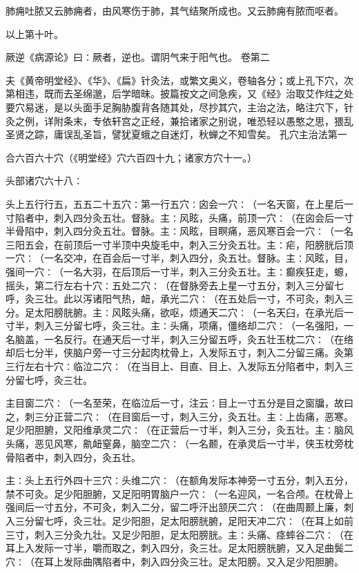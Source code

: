 \documentclass[a4paper,12pt,UTF8,twoside]{ctexbook}
\begin{document}
肺痈吐脓又云肺痈者，由风寒伤于肺，其气结聚所成也。又云肺痈有脓而呕者。

以上第十叶。

厥逆《病源论》曰∶厥者，逆也。谓阴气来于阳气也。
卷第二

夫《黄帝明堂经》、《华》、《扁》针灸法，或繁文奥义，卷轴各分；或上孔下穴，次第相违，既而去圣绵邈，后学暗昧。披篇按文之间急疾，又《经》治取艾作炷之处要穴易迷，是以头面手足胸胁腹背各随其处，尽抄其穴，主治之法，略注穴下，针灸之例，详附条末，专依轩宫之正经，兼拾诸家之别说，唯恐轻以愚憨之思，猥乱圣贤之踪，庸误乱圣旨，譬犹夏蛾之自迷灯，秋蝉之不知雪矣。
孔穴主治法第一

合六百六十穴（《明堂经》穴六百四十九；诸家方穴十一。）

头部诸穴六十八∶

头上五行行五，五五二十五穴∶第一行五穴∶囟会一穴∶（一名天窗，在上星后一寸陷者中，刺入四分灸五壮。督脉。主∶风眩，头痛，前顶一穴∶（在囟会后一寸半骨陷中，刺入四分灸五壮。督脉。主∶风眩，目瞑痛，恶风寒百会一穴∶（一名三阳五会，在前顶后一寸半顶中央旋毛中，刺入三分灸五壮。主∶疟，阳膀胱后顶一穴∶（一名交冲，在百会后一寸半，刺入四分，灸五壮。督脉。主∶风眩，目，强间一穴∶（一名大羽，在后顶后一寸半，刺入三分灸五壮。主∶癫疾狂走，螈，摇头，第二行左右十穴∶五处二穴∶（在督脉旁去上星一寸五分，刺入三分留七呼，灸三壮。此以泻诸阳气热，衄，承光二穴∶（在五处后一寸，不可灸，刺入三分。足太阳膀胱腑。主∶风眩头痛，欲呕，烦通天二穴∶（一名天臼，在承光后一寸半，刺入三分留七呼，灸三壮。主∶头痛，项痛，僵络却二穴∶（一名强阳，一名脑盖，一名反行。在通天后一寸半，刺入三分留五呼，灸五壮玉枕二穴∶（在络却后七分半，侠脑户旁一寸三分起肉枕骨上，入发际五寸，刺入二分留三痛。灸第三行左右十穴∶临泣二穴∶（在当目上、目直、目上、入发际五分陷者中，刺入三分留七呼，灸三壮。

主目窗二穴∶（一名至荣，在临泣后一寸，注云∶目上一寸五分是目之窗牖，故曰之，刺三分正营二穴∶（在目窗后一寸，刺入三分，灸五壮。主∶上齿痛，恶寒。足少阳胆腑，又阳维承灵二穴∶（在正营后一寸半，刺入三分，灸五壮。主∶脑风头痛，恶见风寒，鼽衄窒鼻，脑空二穴∶（一名颞，在承灵后一寸半，侠玉枕旁枕骨陷者中，刺入四分，灸五壮。

主∶头上五行外四十三穴∶头维二穴∶（在额角发际本神旁一寸五分，刺入五分，禁不可灸。足少阳胆腑，又足阳明胃脑户一穴∶（一名迎风，一名合颅。在枕骨上强间后一寸五分，不可灸，刺入二分，留二呼汗出颔厌二穴∶（在曲周颞上廉，刺入三分留七呼，灸三壮。足少阳胆，足太阳膀胱腑，足阳天冲二穴∶（在耳上如前三寸，刺入三分灸九壮。又足少阳胆，足太阳膀胱。主∶头痛、痉蟀谷二穴∶（在耳上入发际一寸半，嚼而取之，刺入四分，灸三壮。足太阳膀胱腑，又入足曲鬓二穴∶（在耳上发际曲隅陷者中，刺入四分灸三壮。足太阳膀。又入足少阳胆腑。
\end{document}
